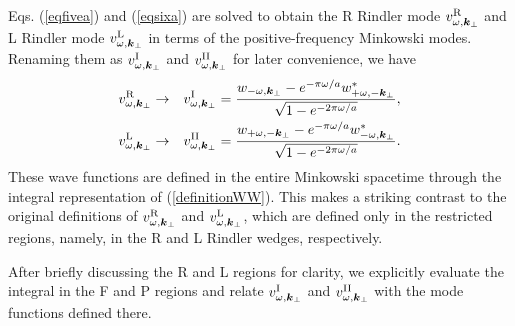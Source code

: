 \documentclass[aps,prd,preprintnumbers,nofootinbib,showpacs,11pt]{revtex4}%
\begin{document}
\begin{widetext}
Eqs. (\ref{eqfivea}) and (\ref{eqsixa}) are solved to obtain
the R Rindler mode $v_{\omega,\bm k_\perp}^{{\rm R}}$ and
L Rindler mode $v_{\omega,\bm k_\perp}^{{\rm L}}$ in terms of the positive-frequency Minkowski
modes. Renaming them as $v_{\omega,\bm k_\perp}^{{\rm I}}$ and $v_{\omega,\bm k_\perp}^{{\rm II}}$ for later
convenience,
we have
\begin{eqnarray}
v_{\omega,\bm k_\perp}^{\R} &\rightarrow& v^{\rm I}_{\omega,{\bm k}_\perp}
=  \frac{w_{-\omega, {\bm k}_\perp} - e^{-\pi\omega/a}w_{+\omega,-{\bm k}_\perp}^{*}}{\sqrt{ 1 - e^{-2\pi\omega/a}}},
\label{eqfiveai}
\\
v_{\omega,\bm k_\perp}^{\L} &\rightarrow&v^{\rm II}_{\omega,{\bm k}_\perp}
 =  \frac{w_{+\omega,-{\bm k}_\perp} - e^{-\pi\omega/a}w_{-\omega,{\bm k}_\perp}^{*}}{\sqrt{1-e^{-2\pi \omega/a}}} .
\label{eqsixai}
\end{eqnarray}
These wave functions are 
defined in the entire Minkowski spacetime through the integral representation of (\ref{definitionWW}).
This makes a striking contrast to the original definitions of $v_{\omega,\bm k_\perp}^{{\rm R}}$
and $v_{\omega,\bm k_\perp}^{{\rm L}}$, which are defined only in the restricted regions, namely,
in the R and L Rindler wedges, respectively.

After briefly discussing the R and L regions for clarity, 
we explicitly evaluate the integral in the F and P regions and relate
  $v_{\omega,\bm k_\perp}^{{\rm I}}$ and $v_{\omega,\bm k_\perp}^{{\rm II}}$
 with the mode functions defined there.




\end{widetext}
\end{document}
